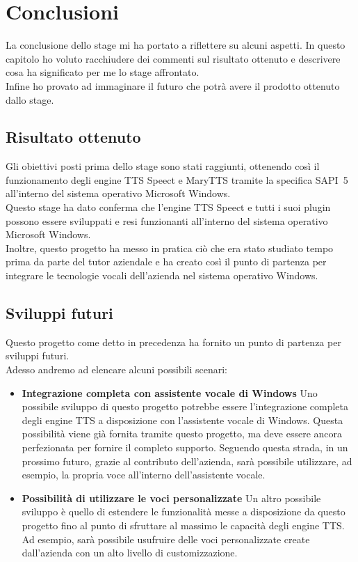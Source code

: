 \chapter{Conclusioni}
La conclusione dello stage mi ha portato a riflettere su alcuni aspetti.
In questo capitolo ho voluto racchiudere dei commenti sul risultato ottenuto e descrivere cosa ha significato per me lo stage affrontato.\\
Infine ho provato ad immaginare il futuro che potrà avere il prodotto ottenuto dallo stage.
\thispagestyle{empty}

\newpage

\section{Risultato ottenuto}
Gli obiettivi posti prima dello stage sono stati raggiunti, ottenendo così il funzionamento degli engine TTS Speect e MaryTTS tramite la specifica SAPI~5 all'interno del sistema operativo Microsoft Windows.\\
Questo stage ha dato conferma che l'engine TTS Speect e tutti i suoi plugin possono essere sviluppati e resi funzionanti all'interno del sistema operativo Microsoft Windows.\\
Inoltre, questo progetto ha messo in pratica ciò che era stato studiato tempo prima da parte del tutor aziendale e ha creato così il punto di partenza per integrare le tecnologie vocali dell'azienda nel sistema operativo Windows.

\section{Sviluppi futuri}
Questo progetto come detto in precedenza ha fornito un punto di partenza per sviluppi futuri.\\
Adesso andremo ad elencare alcuni possibili scenari:
\begin{itemize}
	\item \textbf{Integrazione completa con assistente vocale di Windows} Uno possibile sviluppo di questo progetto potrebbe essere l'integrazione completa degli engine TTS a disposizione con l'assistente vocale di Windows. Questa possibilità viene già fornita tramite questo progetto, ma deve essere ancora perfezionata per fornire il completo supporto.
	Seguendo questa strada, in un prossimo futuro, grazie al contributo dell'azienda, sarà possibile utilizzare, ad esempio, la propria voce all'interno dell'assistente vocale.
	\item \textbf{Possibilità di utilizzare le voci personalizzate} Un altro possibile sviluppo è quello di estendere le funzionalità messe a disposizione da questo progetto fino al punto di sfruttare al massimo le capacità degli engine TTS.
	Ad esempio, sarà possibile usufruire delle voci personalizzate create dall'azienda con un alto livello di customizzazione.
\end{itemize}

